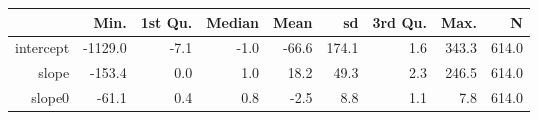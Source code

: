 \begin{table}[ht]
\centering
\begin{tabular}{rrrrrrrrr}
  \hline
 & Min. & 1st Qu. & Median & Mean & sd & 3rd Qu. & Max. & N \\ 
  \hline
intercept & -1129.0 & -7.1 & -1.0 & -66.6 & 174.1 & 1.6 & 343.3 & 614.0 \\ 
  slope & -153.4 & 0.0 & 1.0 & 18.2 & 49.3 & 2.3 & 246.5 & 614.0 \\ 
  slope0 & -61.1 & 0.4 & 0.8 & -2.5 & 8.8 & 1.1 & 7.8 & 614.0 \\ 
   \hline
\end{tabular}
\end{table}
